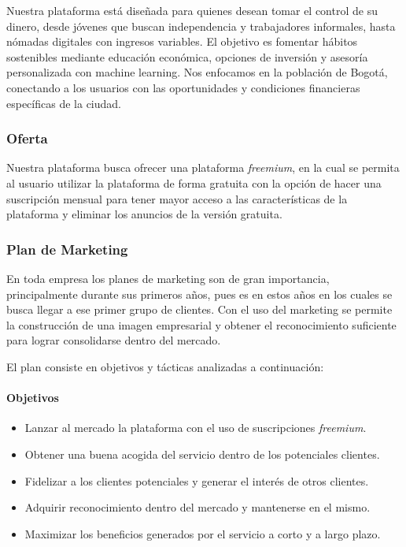 Nuestra plataforma está diseñada para quienes desean tomar el control de su dinero, desde jóvenes que buscan independencia y trabajadores informales, hasta nómadas digitales con ingresos variables. El objetivo es fomentar hábitos sostenibles mediante educación económica, opciones de inversión y asesoría personalizada con machine learning. Nos enfocamos en la población de Bogotá, conectando a los usuarios con las oportunidades y condiciones financieras específicas de la ciudad.

{}
\subsubsection*{Oferta}

Nuestra plataforma busca ofrecer una plataforma \textit{freemium}, en la cual se permita al usuario utilizar la plataforma de forma gratuita con la opción de hacer una suscripción mensual para tener mayor acceso a las características de la plataforma y eliminar los anuncios de la versión gratuita.

{}
\subsubsection*{Plan de Marketing}

En toda empresa los planes de marketing son de gran importancia, principalmente durante sus primeros años, pues es en estos años en los cuales se busca llegar a ese primer grupo de clientes. Con el uso del marketing se permite la construcción de una imagen empresarial y obtener el reconocimiento suficiente para lograr consolidarse dentro del mercado.

El plan consiste en objetivos y tácticas analizadas a continuación:

{}
\paragraph*{Objetivos}


\begin{itemize}
	\item Lanzar al mercado la plataforma con el uso de suscripciones \textit{freemium}.
	
	\item Obtener una buena acogida del servicio dentro de los potenciales clientes.
	
	\item Fidelizar a los clientes potenciales y generar el interés de otros clientes.
	
	\item Adquirir reconocimiento dentro del mercado y mantenerse en el mismo.
	
	\item Maximizar los beneficios generados por el servicio a corto y a largo plazo.
\end{itemize}

